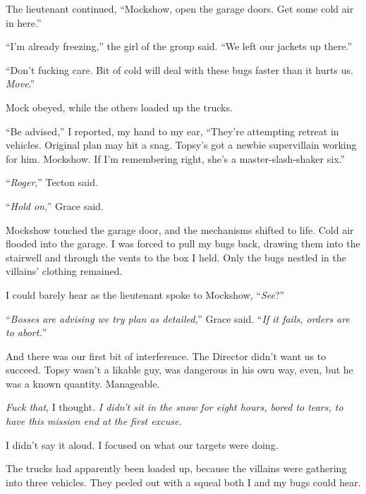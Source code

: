 The lieutenant continued, ``Mockshow, open the garage doors.  Get some cold air in here.''



``I'm already freezing,'' the girl of the group said.  ``We left our jackets up there.''



``Don't fucking care.  Bit of cold will deal with these bugs faster than it hurts us.  \emph{Move}.''



Mock obeyed, while the others loaded up the trucks.



``Be advised,'' I reported, my hand to my ear, ``They're attempting retreat in vehicles.  Original plan may hit a snag.  Topsy's got a newbie supervillain working for him.  Mockshow.  If I'm remembering right, she's a master-slash-shaker six.''



``\emph{Roger},'' Tecton said.



``\emph{Hold on},'' Grace said.



Mockshow touched the garage door, and the mechanisms shifted to life.  Cold air flooded into the garage.  I was forced to pull my bugs back, drawing them into the stairwell and through the vents to the box I held.  Only the bugs nestled in the villains' clothing remained.



I could barely hear as the lieutenant spoke to Mockshow, ``\emph{See}?''



``\emph{Bosses are advising we try plan as detailed},'' Grace said.  ``\emph{If it fails, orders are to abort.}''



And there was our first bit of interference.  The Director didn't want us to succeed.  Topsy wasn't a likable guy, was dangerous in his own way, even, but he was a known quantity.  Manageable.



\emph{Fuck that}, I thought.  \emph{I didn't sit in the snow for eight hours, bored to tears, to have this  mission end at the first excuse.}



I didn't say it aloud.  I focused on what our targets were doing.



The trucks had apparently been loaded up, because the villains were gathering into three vehicles.  They peeled out with a squeal both I and my bugs could hear.




